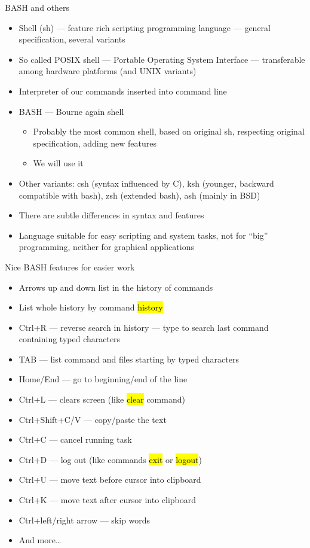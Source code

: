 \documentclass[compress, ucs, xelatex, 11pt, xcolor=svgnames,
  hyperref={
    bookmarks=true,
    unicode=true,
    colorlinks=true,
    pdftitle={Linux, command line and MetaCentrum},
    plainpages=false,
    pdfauthor={Vojtech Zeisek},
    pdfsubject={Course about use of Linux command line, writing shell scripts and using MetaCentrum of CESNET},
    pdfcreator={XeLaTeX, http://www.xelatex.org/},
    pdfkeywords={Linux, GNU, BASH, shell, command line, MetaCentrum},
    linkcolor=Sienna,
    anchorcolor=black,
    citecolor=green,
    filecolor=magenta,
    menucolor=Sienna,
    urlcolor=cyan,
    pdftex},
  url={hyphens, lowtilde} %
  ]{beamer}
\renewcommand{\texttt}[1]{\hl{\ttfamily #1}}
\begin{document}
\begin{frame}{BASH and others}
\begin{itemize}
  \item Shell (sh) --- feature rich scripting programming language --- general specification, several variants
  \item So called POSIX shell --- Portable Operating System Interface --- transferable among hardware platforms (and UNIX variants)
  \item Interpreter of our commands inserted into command line
  \item BASH --- Bourne again shell
  \begin{itemize}
    \item Probably the most common shell, based on original sh, respecting original specification, adding new features
    \item We will use it
  \end{itemize}
  \item Other variants: csh (syntax influenced by C), ksh (younger, backward compatible with bash), zsh (extended bash), ash (mainly in BSD)
  \item There are subtle differences in syntax and features
  \item Language suitable for easy scripting and system tasks, not for ``big'' programming, neither for graphical applications
\end{itemize}
\end{frame}

\begin{frame}{Nice BASH features for easier work}
\begin{itemize}
  \item Arrows up and down list in the history of commands
  \item List whole history by command \texttt{history}
  \item Ctrl+R --- reverse search in history --- type to search last command containing typed characters
  \item TAB --- list command and files starting by typed characters
  \item Home/End --- go to beginning/end of the line
  \item Ctrl+L --- clears screen (like \texttt{clear} command)
  \item Ctrl+Shift+C/V --- copy/paste the text
  \item Ctrl+C --- cancel running task
  \item Ctrl+D --- log out (like commands \texttt{exit} or \texttt{logout})
  \item Ctrl+U --- move text before cursor into clipboard
  \item Ctrl+K --- move text after cursor into clipboard
  \item Ctrl+left/right arrow --- skip words
  \item And more\ldots
\end{itemize}
\end{frame}
\end{document}
